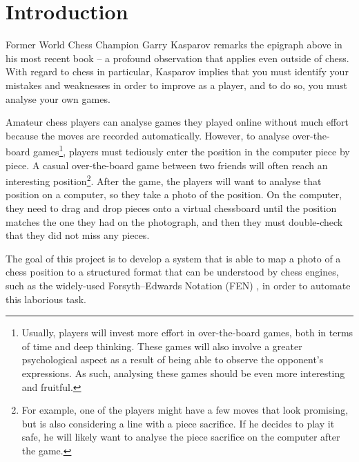 \documentclass[../main.tex]{subfiles}
\begin{document}
\chapter{Introduction}

Former World Chess Champion Garry Kasparov remarks the epigraph above in his most recent book \cite{kasparov2018} -- a profound observation that applies even outside of chess.
With regard to chess in particular, Kasparov implies that you must identify your mistakes and weaknesses in order to improve as a player, and to do so, you must analyse your own games. 

Amateur chess players can analyse games they played online without much effort because the moves are recorded automatically.
However, to analyse over-the-board games\footnote{Usually, players will invest more effort in over-the-board games, both in terms of time and deep thinking. These games will also involve a greater psychological aspect as a result of being able to observe the opponent's expressions. As such, analysing these games should be even more interesting and fruitful.}, players must tediously enter the position in the computer piece by piece.
A casual over-the-board game between two friends will often reach an interesting position\footnote{For example, one of the players might have a few moves that look promising, but is also considering a line with a piece sacrifice. If he decides to play it safe, he will likely want to analyse the piece sacrifice on the computer after the game.}. 
After the game, the players will want to analyse that position on a computer, so they take a photo of the position. 
On the computer, they need to drag and drop pieces onto a virtual chessboard until the position matches the one they had on the photograph, and then they must double-check that they did not miss any pieces.

The goal of this project is to develop a system that is able to map a photo of a chess position to a structured format that can be understood by chess engines, such as the widely-used Forsyth–Edwards Notation (FEN) \cite{edwards1994}, in order to automate this laborious task.





\end{document}
